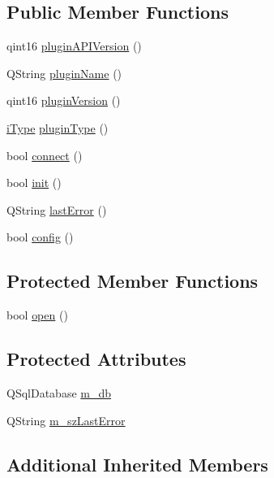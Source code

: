 \subsection*{Public Member Functions}
\begin{DoxyCompactItemize}
\item 
qint16 \hyperlink{classc_s_q_lite_plugin_abe6689a26729e68d2167eb87e3bc2768}{plugin\+A\+P\+I\+Version} ()
\item 
Q\+String \hyperlink{classc_s_q_lite_plugin_a073f7e6b4fa9804c58bdb4a5a758ffa4}{plugin\+Name} ()
\item 
qint16 \hyperlink{classc_s_q_lite_plugin_a680ffa394cab1bd545080c4ea72bd442}{plugin\+Version} ()
\item 
\hyperlink{classc_interface_a41462a3131755963add9ba3026e7d31a}{i\+Type} \hyperlink{classc_s_q_lite_plugin_a1ba9b4a2e7dc962bbc67a89dc928fcee}{plugin\+Type} ()
\item 
bool \hyperlink{classc_s_q_lite_plugin_a0a3bef23b97f92e6df13248533cdb3e5}{connect} ()
\item 
bool \hyperlink{classc_s_q_lite_plugin_a5ed58193b879741aa561e6b5b24728a0}{init} ()
\item 
Q\+String \hyperlink{classc_s_q_lite_plugin_a559d79aa121a1d04ba89ae3cc641baf8}{last\+Error} ()
\item 
bool \hyperlink{classc_s_q_lite_plugin_a0ebe7b647b44908f2717c86900ac679d}{config} ()
\end{DoxyCompactItemize}
\subsection*{Protected Member Functions}
\begin{DoxyCompactItemize}
\item 
bool \hyperlink{classc_s_q_lite_plugin_ab826f374afd77f9b0118131eb6ae368f}{open} ()
\end{DoxyCompactItemize}
\subsection*{Protected Attributes}
\begin{DoxyCompactItemize}
\item 
Q\+Sql\+Database \hyperlink{classc_s_q_lite_plugin_a3e3b9845869292d92f7d37e1ffa90df5}{m\+\_\+db}
\item 
Q\+String \hyperlink{classc_s_q_lite_plugin_a2f6c0e82b435799bd544d8a1847f4d1a}{m\+\_\+sz\+Last\+Error}
\end{DoxyCompactItemize}
\subsection*{Additional Inherited Members}


